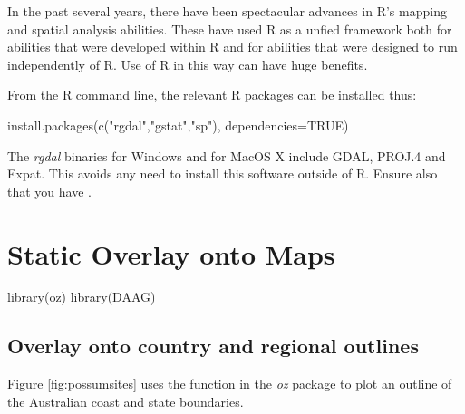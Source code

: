





In the past several years, there have been spectacular advances in R's
mapping and spatial analysis abilities. These have used R as a unfied
framework both for abilities that were developed within R and for
abilities that were designed to run independently of R.  Use of R in
this way can have huge benefits.

From the R command line, the relevant R packages can be installed thus:
\begin{Schunk}
\begin{Sinput}
install.packages(c("rgdal","gstat","sp"),
                 dependencies=TRUE)
\end{Sinput}
\end{Schunk}

The {\em rgdal} binaries for Windows and for MacOS X include GDAL,
PROJ.4 and Expat. This avoids any need to install this software
outside of R. Ensure also that you have .

\section{Static Overlay onto Maps}

\begin{Schunk}
\begin{Sinput}
library(oz)
library(DAAG)
\end{Sinput}
\end{Schunk}

\subsection{Overlay onto country and regional outlines}

Figure \ref{fig:possumsites} uses the function  in the
\textit{oz} package to plot an outline of the Australian coast and
state boundaries.

